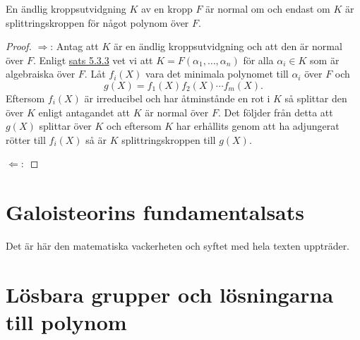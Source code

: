 \documentclass{article}
\theoremstyle{definition}
\begin{document}
\begin{mytheo}{}{}
  En ändlig kroppsutvidgning $K$ av en kropp $F$ är normal om och endast om $K$ är splittringskroppen för något polynom över $F.$
\end{mytheo}
\begin{proof}
  $\Rightarrow$: Antag att $K$ är en ändlig kroppsutvidgning och att den är normal över $F$. Enligt \hyperlink{sats5.3.3}{sats 5.3.3}
  vet vi att $K = F(\alpha_1, \ldots, \alpha_n)$ för alla $\alpha_i \in K$ som är algebraiska över $F.$ Låt $f_i(X)$ vara det minimala polynomet 
  till $\alpha_i$ över $F$ och 
  \[g(X) = f_1(X) f_2(X) \cdots f_m(X).\] 
  Eftersom $f_i(X)$ är irreducibel och har åtminstånde en rot i $K$ så splittar den över $K$ enligt antagandet att $K$ är normal över $F$. Det följder från detta 
  att $g(X)$ splittar över $K$ och eftersom $K$ har erhållits genom att ha adjungerat rötter till $f_i(X)$ så är $K$ splittringskroppen till $g(X).$

  $\Leftarrow:$
\end{proof}

\section{Galoisteorins fundamentalsats}
Det är här den matematiska vackerheten och syftet med hela texten uppträder.
\section{Lösbara grupper och lösningarna till polynom}
\end{document}
